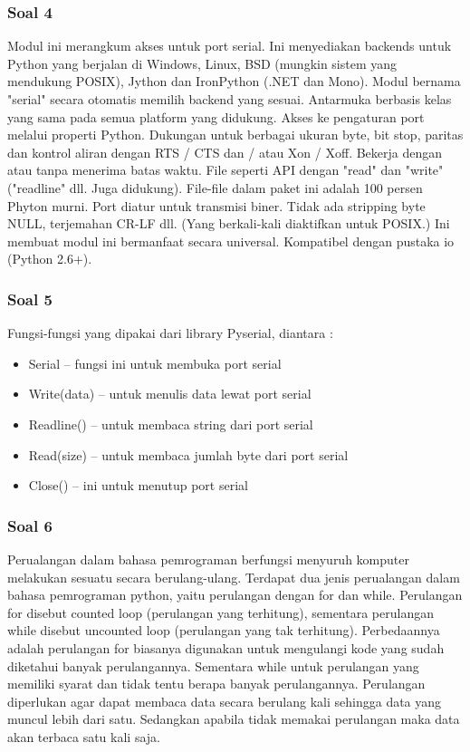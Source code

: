 \subsubsection{Soal 4}
Modul ini merangkum akses untuk port serial. Ini menyediakan backends untuk Python yang berjalan di Windows, Linux, BSD (mungkin sistem yang mendukung POSIX), Jython dan IronPython (.NET dan Mono). Modul bernama "serial" secara otomatis memilih backend yang sesuai. Antarmuka berbasis kelas yang sama pada semua platform yang didukung.
Akses ke pengaturan port melalui properti Python. 
Dukungan untuk berbagai ukuran byte, bit stop, paritas dan kontrol aliran dengan RTS / CTS dan / atau Xon / Xoff.
Bekerja dengan atau tanpa menerima batas waktu.
File seperti API dengan "read" dan "write" ("readline" dll. Juga didukung).
File-file dalam paket ini adalah 100 persen Phyton murni.
Port diatur untuk transmisi biner. Tidak ada stripping byte NULL, terjemahan CR-LF dll. (Yang berkali-kali diaktifkan untuk POSIX.) Ini membuat modul ini bermanfaat secara universal.
Kompatibel dengan pustaka io (Python 2.6+).

\subsubsection{Soal 5}
Fungsi-fungsi yang dipakai dari library Pyserial, diantara :
\begin{itemize}
\item Serial – fungsi ini untuk membuka port serial
\item Write(data) – untuk menulis data lewat port serial
\item Readline() – untuk membaca string dari port serial
\item Read(size) – untuk membaca jumlah byte dari port serial
\item Close() – ini untuk menutup port serial 
\end{itemize}

\subsubsection{Soal 6}
Perualangan dalam bahasa pemrograman berfungsi menyuruh komputer melakukan sesuatu secara berulang-ulang. Terdapat dua jenis perualangan dalam bahasa pemrograman python, yaitu perulangan dengan for dan while. Perulangan for disebut counted loop (perulangan yang terhitung), sementara perulangan while disebut uncounted loop (perulangan yang tak terhitung). Perbedaannya adalah perulangan for biasanya digunakan untuk mengulangi kode yang sudah diketahui banyak perulangannya. Sementara while untuk perulangan yang memiliki syarat dan tidak tentu berapa banyak perulangannya. Perulangan diperlukan agar dapat membaca data secara berulang kali sehingga data yang muncul lebih dari satu.  Sedangkan apabila tidak memakai perulangan maka data akan terbaca satu kali saja.

